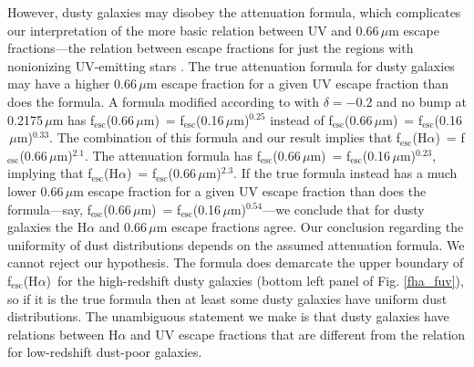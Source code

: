 \documentclass[referee]{aa}
\newcommand{\alephuv}{f$_{\mathrm{esc}}$(0.16$\,\mu$m)}
\newcommand{\alephha}{f$_{\mathrm{esc}}$(H$\alpha$)}
\newcommand{\alephuvha}{f$_{\mathrm{esc}}$(0.66$\,\mu$m)}
\begin{document}
However, dusty galaxies may disobey the \citet{calzetti00} attenuation
formula, which complicates our interpretation of the more basic relation
between UV and 0.66$\,\mu$m escape fractions---the relation between
escape fractions for just the regions with nonionizing UV-emitting stars
\citep{reddy10,reddy12,reddy15,buat11,buat12,penner12,kriek13}.  The true attenuation
formula for dusty galaxies may have a higher 0.66$\,\mu$m escape fraction
for a given UV escape fraction than does the \citet{calzetti00} formula.  A
formula modified according to
\citet{kriek13} with $\delta = -0.2$ and no bump at 0.2175$\,\mu$m has
\alephuvha~=
\alephuv$^{0.25}$ instead of \alephuvha~= \alephuv$^{0.33}$.  The combination of
this \citet{kriek13} formula and our result implies that
\alephha~= \alephuvha$^{2.1}$.  The \citet{reddy15} attenuation formula has
\alephuvha~= \alephuv$^{0.23}$, implying that \alephha~= \alephuvha$^{2.3}$.
If the true formula instead has a
much lower 0.66$\,\mu$m escape fraction for a given UV escape
fraction than does the \citet{calzetti00} formula---say, \alephuvha~=
\alephuv$^{0.54}$---we conclude that for dusty
galaxies the H$\alpha$ and 0.66$\,\mu$m escape fractions agree.  Our
conclusion regarding the uniformity of dust distributions depends on the
assumed attenuation formula.  We cannot reject our hypothesis.  The
\citet{calzetti00} formula does demarcate the upper boundary of \alephha~for the
high-redshift dusty galaxies (bottom left panel of Fig. \ref{fha_fuv}), so
if it is the true formula then at least some dusty galaxies have uniform
dust distributions.  The unambiguous statement we make is that dusty galaxies
have relations between H$\alpha$ and UV escape fractions that are different from
the relation for low-redshift dust-poor galaxies.
\end{document}
